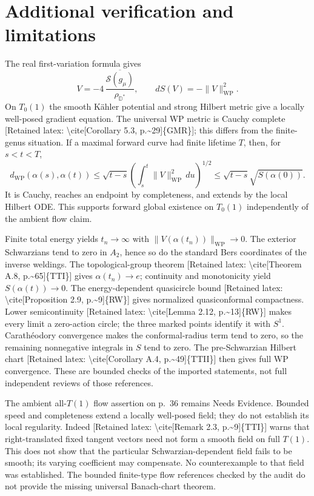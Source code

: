 \documentclass[10pt]{article}
\begin{document}
\section*{Additional verification and limitations}
The real first-variation formula gives \[V=-4\,\frac{\overline{\mathcal S(g_\mu)}}{\rho_{\mathbb D^*}},
 \qquad dS(V)=-\|V\|_{\mathrm{WP}}^2.\] On \(T_0(1)\) the smooth Kähler potential and strong Hilbert metric give a locally well-posed gradient equation. The universal WP metric is Cauchy complete [Retained latex: \textbackslash{}cite[Corollary 5.3, p.\textasciitilde{}29]\{GMR\}]; this differs from the finite-genus situation. If a maximal forward curve had finite lifetime \(T\), then, for \(s<t<T\), \[d_{\mathrm{WP}}(\alpha(s),\alpha(t))
 \leq\sqrt{t-s}
 \left(\int_s^t\|V\|_{\mathrm{WP}}^2\,du\right)^{1/2}
 \leq\sqrt{t-s}\sqrt{S(\alpha(0))}.\] It is Cauchy, reaches an endpoint by completeness, and extends by the local Hilbert ODE. This supports forward global existence on \(T_0(1)\) independently of the ambient flow claim.\par
Finite total energy yields \(t_n\to\infty\) with \(\|V(\alpha(t_n))\|_{\mathrm{WP}}\to0\). The exterior Schwarzians tend to zero in \(A_2\), hence so do the standard Bers coordinates of the inverse weldings. The topological-group theorem [Retained latex: \textbackslash{}cite[Theorem A.8, p.\textasciitilde{}65]\{TTI\}] gives \(\alpha(t_n)\to e\); continuity and monotonicity yield \(S(\alpha(t))\to0\). The energy-dependent quasicircle bound [Retained latex: \textbackslash{}cite[Proposition 2.9, p.\textasciitilde{}9]\{RW\}] gives normalized quasiconformal compactness. Lower semicontinuity [Retained latex: \textbackslash{}cite[Lemma 2.12, p.\textasciitilde{}13]\{RW\}] makes every limit a zero-action circle; the three marked points identify it with \(S^1\). Carathéodory convergence makes the conformal-radius term tend to zero, so the remaining nonnegative integrals in \(S\) tend to zero. The pre-Schwarzian Hilbert chart [Retained latex: \textbackslash{}cite[Corollary A.4, p.\textasciitilde{}49]\{TTII\}] then gives full WP convergence. These are bounded checks of the imported statements, not full independent reviews of those references.\par
The ambient all-\(T(1)\) flow assertion on p. 36 remains Needs Evidence. Bounded speed and completeness extend a locally well-posed field; they do not establish its local regularity. Indeed [Retained latex: \textbackslash{}cite[Remark 2.3, p.\textasciitilde{}9]\{TTI\}] warns that right-translated fixed tangent vectors need not form a smooth field on full \(T(1)\). This does not show that the particular Schwarzian-dependent field fails to be smooth; its varying coefficient may compensate. No counterexample to that field was established. The bounded finite-type flow references checked by the audit do not provide the missing universal Banach-chart theorem.\par
\end{document}
